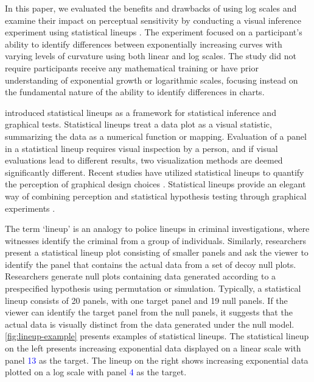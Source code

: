 \documentclass[12pt]{article}
\begin{document}
In this paper, we evaluated the benefits and drawbacks of using log
scales and examine their impact on perceptual sensitivity by conducting
a visual inference experiment using statistical lineups
\citep{buja_statistical_2009}. The experiment focused on a participant's
ability to identify differences between exponentially increasing curves
with varying levels of curvature using both linear and log scales. The
study did not require participants receive any mathematical training or
have prior understanding of exponential growth or logarithmic scales,
focusing instead on the fundamental nature of the ability to identify
differences in charts.

\citet{buja_statistical_2009} introduced statistical lineups as a
framework for statistical inference and graphical tests. Statistical
lineups treat a data plot as a visual statistic, summarizing the data as
a numerical function or mapping. Evaluation of a panel in a statistical
lineup requires visual inspection by a person, and if visual evaluations
lead to different results, two visualization methods are deemed
significantly different. Recent studies have utilized statistical
lineups to quantify the perception of graphical design choices
\citep{hofmann_graphical_2012, loy_model_2017, loy_variations_2016, vanderplas_clusters_2017}.
Statistical lineups provide an elegant way of combining perception and
statistical hypothesis testing through graphical experiments
\citep{majumder_validation_2013, vanderplas_testing_2020, wickham2010graphical}.

The term `lineup' is an analogy to police lineups in criminal
investigations, where witnesses identify the criminal from a group of
individuals. Similarly, researchers present a statistical lineup plot
consisting of smaller panels and ask the viewer to identify the panel
that contains the actual data from a set of decoy null plots.
Researchers generate null plots containing data generated according to a
prespecified hypothesis using permutation or simulation. Typically, a
statistical lineup consists of 20 panels, with one target panel and 19
null panels. If the viewer can identify the target panel from the null
panels, it suggests that the actual data is visually distinct from the
data generated under the null model. \cref{fig:lineup-example} presents
examples of statistical lineups. The statistical lineup on the left
presents increasing exponential data displayed on a linear scale with
panel {\textcolor{blue}{13}} as the target. The lineup on the right
shows increasing exponential data plotted on a log scale with panel
{\textcolor{blue}{4}} as the target.
\end{document}
